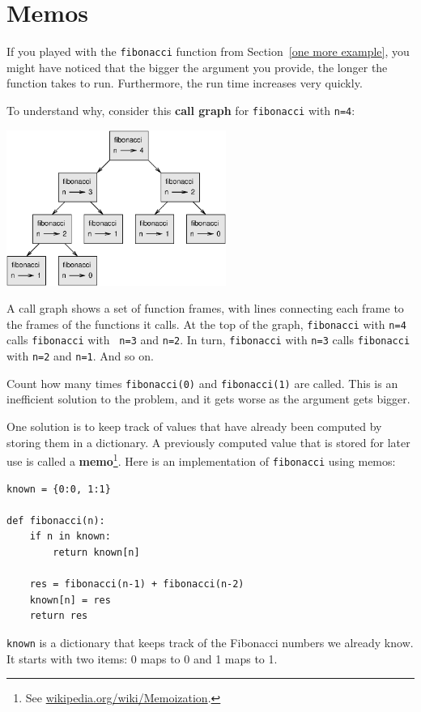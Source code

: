 \documentclass[10pt]{book}
\begin{document}
\section{Memos}

If you played with the {\tt fibonacci} function from
Section~\ref{one more example}, you might have noticed that the bigger
the argument you provide, the longer the function takes to run.
Furthermore, the run time increases very quickly.


To understand why, consider this {\bf call graph} for
{\tt fibonacci} with {\tt n=4}:

\beforefig
\centerline{\includegraphics[height=2in]{figs/fibonacci.eps}}
\afterfig

A call graph shows a set of function frames, with lines connecting each
frame to the frames of the functions it calls.  At the top of the
graph, {\tt fibonacci} with {\tt n=4} calls {\tt fibonacci} with {\tt
n=3} and {\tt n=2}.  In turn, {\tt fibonacci} with {\tt n=3} calls
{\tt fibonacci} with {\tt n=2} and {\tt n=1}.  And so on.


Count how many times {\tt fibonacci(0)} and {\tt fibonacci(1)} are
called.  This is an inefficient solution to the problem, and it gets
worse as the argument gets bigger.


One solution is to keep track of values that have already been
computed by storing them in a dictionary.  A previously computed value
that is stored for later use is called a {\bf memo}\footnote{See
  \url{wikipedia.org/wiki/Memoization}.}.  Here is an
implementation of {\tt fibonacci} using memos:

\beforeverb
\begin{verbatim}
known = {0:0, 1:1}

def fibonacci(n):
    if n in known:
        return known[n]

    res = fibonacci(n-1) + fibonacci(n-2)
    known[n] = res
    return res
\end{verbatim}
\afterverb
%
{\tt known} is a dictionary that keeps track of the Fibonacci
numbers we already know.  It starts with
two items: 0 maps to 0 and 1 maps to 1.
\end{document}
